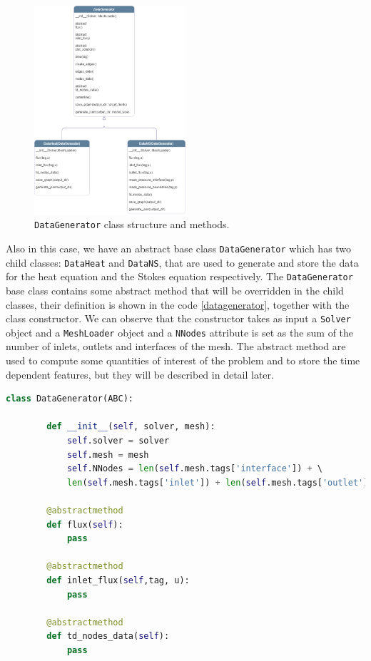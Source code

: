\documentclass[11pt,a4paper]{article}
\begin{document}
\begin{figure}[H]
    \centering
    \includegraphics[width=0.5\textwidth]{Images/datagenerator_class.png}
    \caption{\texttt{DataGenerator} class structure and methods.}
    \label{datagenerator_class}
\end{figure}

Also in this case, we have an abstract base class \texttt{DataGenerator} which has two child classes: \texttt{DataHeat} and \texttt{DataNS}, that are used to generate and store the data for the heat equation and the Stokes equation respectively.
The \texttt{DataGenerator} base class contains some abstract method that will be overridden in the child classes, their definition is shown in the code \ref{datagenerator}, together with the class constructor. We can observe that the constructor takes as input a \texttt{Solver} object and a \texttt{MeshLoader} object and a \texttt{NNodes} attribute is set as the sum of the number of inlets, outlets and interfaces of the mesh. The abstract method are used to compute some quantities of interest of the problem and to store the time dependent features, but they will be described in detail later.

\begin{lstlisting}[language=Python, caption={Solver class.}, label={datagenerator}]
    class DataGenerator(ABC):

        def __init__(self, solver, mesh):
            self.solver = solver
            self.mesh = mesh
            self.NNodes = len(self.mesh.tags['interface']) + \ 
            len(self.mesh.tags['inlet']) + len(self.mesh.tags['outlet'])

        @abstractmethod
        def flux(self):
            pass

        @abstractmethod
        def inlet_flux(self,tag, u):
            pass

        @abstractmethod
        def td_nodes_data(self):
            pass
        
\end{lstlisting}
\end{document}
